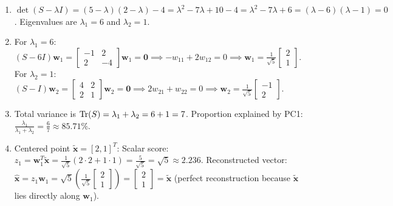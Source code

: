 \begin{enumerate}[label=(\alph*)]
    \item $\det(S - \lambda I) = (5 - \lambda)(2 - \lambda) - 4 = \lambda^2 - 7\lambda + 10 - 4 = \lambda^2 - 7\lambda + 6 = (\lambda - 6)(\lambda - 1) = 0$.
    Eigenvalues are $\lambda_1 = 6$ and $\lambda_2 = 1$.
    \item For $\lambda_1 = 6$: $(S - 6I)\mathbf{w}_1 = \begin{bmatrix} -1 & 2 \\ 2 & -4 \end{bmatrix}\mathbf{w}_1 = \mathbf{0} \implies -w_{11} + 2w_{12} = 0 \implies \mathbf{w}_1 = \frac{1}{\sqrt{5}}\begin{bmatrix} 2 \\ 1 \end{bmatrix}$.
    For $\lambda_2 = 1$: $(S - I)\mathbf{w}_2 = \begin{bmatrix} 4 & 2 \\ 2 & 1 \end{bmatrix}\mathbf{w}_2 = \mathbf{0} \implies 2w_{21} + w_{22} = 0 \implies \mathbf{w}_2 = \frac{1}{\sqrt{5}}\begin{bmatrix} -1 \\ 2 \end{bmatrix}$.
    \item Total variance is $\operatorname{Tr}(S) = \lambda_1 + \lambda_2 = 6 + 1 = 7$.
    Proportion explained by PC1: $\frac{\lambda_1}{\lambda_1 + \lambda_2} = \frac{6}{7} \approx 85.71\%$.
    \item Centered point $\tilde{\mathbf{x}} = [2, 1]^T$:
    Scalar score: $z_1 = \mathbf{w}_1^T \tilde{\mathbf{x}} = \frac{1}{\sqrt{5}} (2 \cdot 2 + 1 \cdot 1) = \frac{5}{\sqrt{5}} = \sqrt{5} \approx 2.236$.
    Reconstructed vector: $\hat{\mathbf{x}} = z_1 \mathbf{w}_1 = \sqrt{5} \left( \frac{1}{\sqrt{5}}\begin{bmatrix} 2 \\ 1 \end{bmatrix} \right) = \begin{bmatrix} 2 \\ 1 \end{bmatrix} = \tilde{\mathbf{x}}$ (perfect reconstruction because $\tilde{\mathbf{x}}$ lies directly along $\mathbf{w}_1$).
\end{enumerate}

